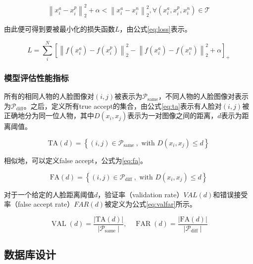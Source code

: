 \begin{equation}
    \left\|x_{i}^{a}-x_{i}^{p}\right\|_{2}^{2}+\alpha<\left\|x_{i}^{a}-x_{i}^{n}\right\|_{2}^{2}, \forall\left(x_{i}^{a}, x_{i}^{p}, x_{i}^{n}\right) \in \mathcal{T}
    \label{eq:tpltll}
\end{equation}

由此便可得到要被最小化的损失函数$L$，由公式\ref{eq:loss}表示。

\begin{equation}
    L=\sum_{i}^{N}\left[\left\|f\left(x_{i}^{a}\right)-f\left(x_{i}^{p}\right)\right\|_{2}^{2}-\left\|f\left(x_{i}^{a}\right)-f\left(x_{i}^{n}\right)\right\|_{2}^{2}+\alpha\right]_{+}
    \label{eq:loss}
\end{equation}

\subsubsection{模型评估性能指标}

所有的相同人物的人脸图像对$(i,j)$被表示为$\mathcal{P}_{\text {same}}$，不同人物的人脸图像对表示为$\mathcal{P}_{\text {diff}}$。之后，定义所有true accept的集合，由公式\ref{eq:ta}表示有人脸对$(i,j)$被正确地分为同一位人物，其中$D\left(x_{i}, x_{j}\right)$表示为一对图像之间的距离，$d$表示为距离阈值。

\begin{equation}
    \mathrm{TA}(d)=\left\{(i, j) \in \mathcal{P}_{\text {same }}, \text { with } D\left(x_{i}, x_{j}\right) \leq d\right\}
    \label{eq:ta}
\end{equation}

相似地，可以定义false accept，公式为\ref{eq:fa}。

\begin{equation}
    \mathrm{FA}(d)=\left\{(i, j) \in \mathcal{P}_{\text {diff }}, \text { with } D\left(x_{i}, x_{j}\right) \leq d\right\}
    \label{eq:fa}
\end{equation}

对于一个给定的人脸距离阈值$d$，验证率（validation rate）$VAL(d)$和错误接受率（false accept rate）$FAR(d)$被定义为公式\ref{eq:valfar}所示。

\begin{equation}
    \operatorname{VAL}(d)=\frac{|\mathrm{TA}(d)|}{\left|\mathcal{P}_{\text {same }}\right|}, \quad \operatorname{FAR}(d)=\frac{|\mathrm{FA}(d)|}{\left|\mathcal{P}_{\text {diff }}\right|}
    \label{eq:valfar}
\end{equation}

\subsection{数据库设计}

